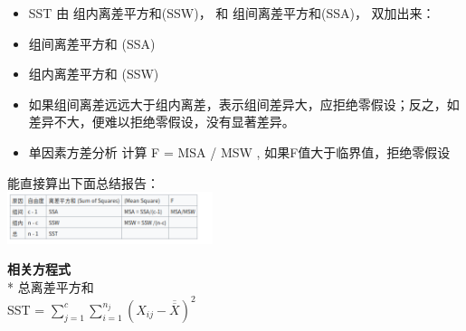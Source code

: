 \begin{description}
\begin{description}
\begin{itemize}
\tightlist
\item
  SST 由 组内离差平方和(SSW)， 和 组间离差平方和(SSA)， 双加出来：
\end{itemize}

\begin{itemize}
\tightlist
\item
  组间离差平方和 (SSA)
\end{itemize}

\begin{itemize}
\tightlist
\item
  组内离差平方和 (SSW)
\end{itemize}

\begin{itemize}
\tightlist
\item
  如果组间离差远远大于组内离差，表示组间差异大，应拒绝零假设；反之，如差异不大，便难以拒绝零假设，没有显著差异。
\end{itemize}

\begin{itemize}
\tightlist
\item
  单因素方差分析 计算 F = MSA / MSW , 如果F值大于临界值，拒绝零假设
\end{itemize}

能直接算出下面总结报告：\\


\includegraphics[width=6cm]{Screenshotfrom2023-02-1401-07-07.png}

\textbf{相关方程式}\\
* 总离差平方和\\
SST =
\(\sum_{j=1}^c \sum_{i=1}^{n_j} (X_{ij} - \overline{\overline{X}})^2\)
\end{description}
\end{description}

\begin{description}
\item[]
\end{description}

